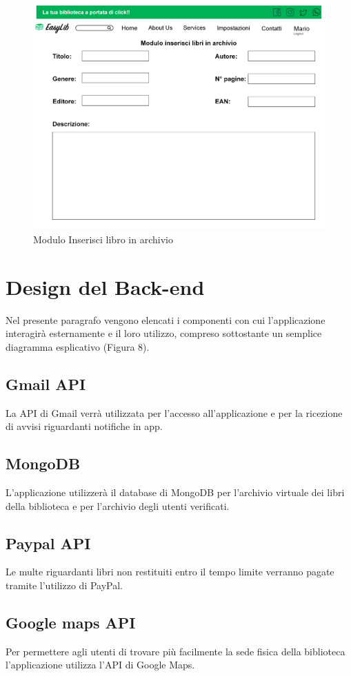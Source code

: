 \documentclass{article}
\begin{document}
\begin{figure}[H]
    \centering
    \includegraphics[width=130mm]{D1/Images/inseriscilibro.png}
    \caption{Modulo Inserisci libro in archivio}
\end{figure}

\section{Design del Back-end}
Nel presente paragrafo vengono elencati i componenti con cui l’applicazione interagirà esternamente e il loro utilizzo, compreso sottostante un semplice diagramma esplicativo (Figura 8).
\subsection*{Gmail API}
La API di Gmail verrà utilizzata per l’accesso all’applicazione e per la ricezione di avvisi riguardanti notifiche in app.
\subsection*{MongoDB}
L’applicazione utilizzerà il database di MongoDB per l’archivio virtuale dei libri della biblioteca e per l’archivio degli utenti verificati.
\subsection*{Paypal API}
Le multe riguardanti libri non restituiti entro il tempo limite verranno pagate tramite l’utilizzo di PayPal.
\subsection*{Google maps API}
Per permettere agli utenti di trovare più facilmente la sede fisica della biblioteca l’applicazione utilizza l’API di Google Maps.
\end{document}
